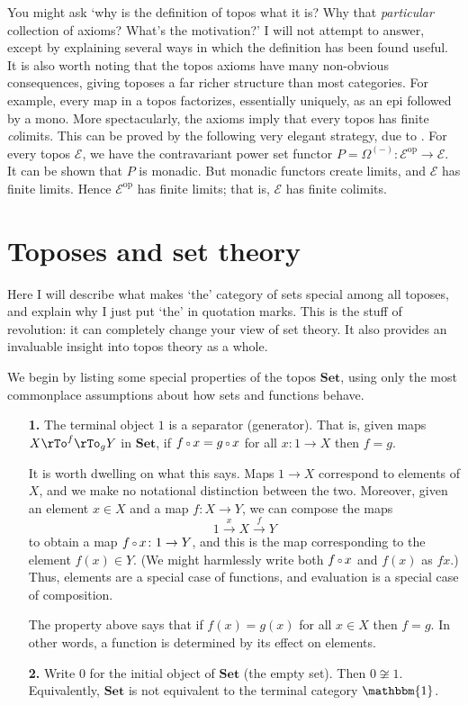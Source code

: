 \documentclass{article}
\newcommand{\dashbk}{-}
\newcommand{\cat}[1]{\mathscr{#1}}
\newcommand{\fcat}[1]{\mathbf{#1}}
\newcommand{\op}{\mathrm{op}}
\newcommand{\Set}{\fcat{Set}}
\newcommand{\parpair}[2]{\pile{\rTo^{\scriptstyle #1}\\ 
\rTo_{\scriptstyle #2}}}
\newcommand{\iso}{\cong}
\newcommand{\of}{\,\raisebox{0.08ex}{\ensuremath{\scriptstyle\circ}}\,}
\newcommand{\One}{\mathbbm{1}}
\newcommand{\E}{\cat{E}}
\newcommand{\toby}[1]{\stackrel{#1}{\to}}
\newcommand{\cln}{\colon}
\begin{document}
You might ask `why is the definition of topos what it is?  Why that
\emph{particular} collection of axioms?  What's the motivation?'  I will not
attempt to answer, except by explaining several ways in which the definition
has been found useful.  It is also worth noting that the topos axioms have
many non-obvious consequences, giving toposes a far richer structure than most
categories.  For example, every map in a topos factorizes, essentially
uniquely, as an epi followed by a mono.  More spectacularly, the axioms imply
that every topos has finite \emph{co}limits.  This can be proved by the
following very elegant strategy, due to \citet{Pare}.  For every topos $\E$,
we have the contravariant power set functor $P = \Omega^{(\dashbk)}\cln \E^\op
\to \E$.  It can be shown that $P$ is monadic.  But monadic functors create
limits, and $\E$ has finite limits.  Hence $\E^\op$ has finite limits; that
is, $\E$ has finite colimits.  



\section{Toposes and set theory}
\label{sec:sets}



Here I will describe what makes `the' category of sets special among all
toposes, and explain why I just put `the' in quotation marks.  This is the
stuff of revolution: it can completely change your view of set theory.  It
also provides an invaluable insight into topos theory as a whole.

We begin by listing some special properties of the topos $\Set$, using only
the most commonplace assumptions about how sets and functions behave.

\begin{enumerate}
\item[\textbf{1.}]  
The terminal object $1$ is a separator (generator).  That is, given maps $X
\parpair{f}{g} Y$ in $\Set$, if $f \of x = g \of x$ for all $x\cln 1 \to X$
then $f = g$.

It is worth dwelling on what this says.  Maps $1 \to X$ correspond to elements
of $X$, and we make no notational distinction between the two.  Moreover,
given an element $x \in X$ and a map $f\cln X \to Y$, we can compose the maps
\[
1 \toby{x} X \toby{f} Y
\]
to obtain a map $f \of x\cln 1 \to Y$, and this is the map corresponding to the
element $f(x) \in Y$.  (We might harmlessly write both $f \of x$ and $f(x)$ as
$fx$.)  Thus, elements are a special case of functions, and evaluation is a
special case of composition.

The property above says that if $f(x) = g(x)$ for all $x \in X$ then $f = g$.
In other words, a function is determined by its effect on elements.

\item[\textbf{2.}]
Write $0$ for the initial object of $\Set$ (the empty set).  Then $0 \not\iso
1$.  Equivalently, $\Set$ is not equivalent to the terminal category $\One$.
\end{enumerate}
\end{document}
